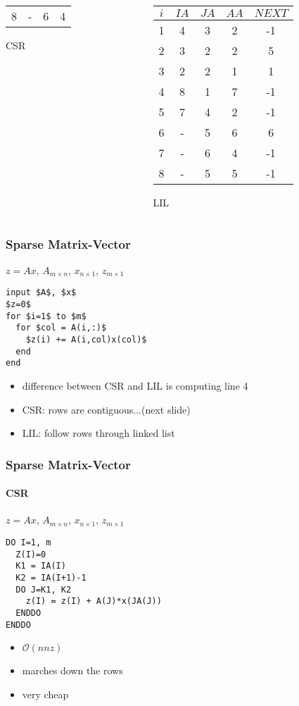 \documentclass[10pt]{beamer}
\newcommand{\mO}{{\mathcal{O}}}
\begin{document}
\begin{frame}[shrink]
\begin{columns}
\begin{column}{0.48\textwidth}
\begin{center}
\begin{tabular}{c | c c c}
    8 & - & 6 & 4\\
    \end{tabular}
    CSR
    \end{center}
  \end{column}
  \begin{column}{0.48\textwidth}
    \begin{center}
    \begin{tabular}{c | c c c c}
    $i$ & $IA$ & $JA$ & $AA$ & $NEXT$\\\hline
    1 & 4 & 3 & 2 & -1\\
    2 & 3 & 2 & 2 &  5\\
    3 & 2 & 2 & 1 &  1\\
    4 & 8 & 1 & 7 & -1\\
    5 & 7 & 4 & 2 & -1\\
    6 & - & 5 & 6 &  6\\
    7 & - & 6 & 4 & -1\\
    8 & - & 5 & 5 & -1\\
    \end{tabular}
    LIL
    \end{center}
  \end{column}
\end{columns}
\end{frame}
\begin{frame}[fragile]
\frametitle{Sparse Matrix-Vector}
$z = Ax$, $A_{m\times n}$, $x_{n\times 1}$, $z_{m\times 1}$
\begin{lstlisting}[mathescape]
input $A$, $x$
$z=0$
for $i=1$ to $m$
  for $col = A(i,:)$
    $z(i) += A(i,col)x(col)$
  end
end
\end{lstlisting}
  \begin{itemize}
  \item difference between CSR and LIL is computing line 4
  \item CSR: rows are contiguous...(next slide)
  \item LIL: follow rows through linked list
  \end{itemize}
\end{frame}
\begin{frame}[fragile]
\frametitle{Sparse Matrix-Vector}
\framesubtitle{CSR}
$z = Ax$, $A_{m\times n}$, $x_{n\times 1}$, $z_{m\times 1}$
\begin{lstlisting}[mathescape, language=FORTRAN]
DO I=1, m
  Z(I)=0
  K1 = IA(I)
  K2 = IA(I+1)-1
  DO J=K1, K2
    z(I) = z(I) + A(J)*x(JA(J))
  ENDDO
ENDDO
\end{lstlisting}
  \begin{itemize}
  \item $\mO(nnz)$
  \item marches down the rows
  \item very cheap
  \end{itemize}
\end{frame}
\end{document}
